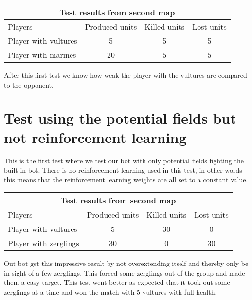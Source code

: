 \begin{centering}
\begin{table}
 \begin{tabular}{|l|c|c|c|}
	\multicolumn{4}{c}{Test results from second map} \\
	\hline
	Players & Produced units & Killed units & Lost units\\
	\hline
		Player with vultures & 5 & 5 & 5\\
	\hline
		Player with marines & 20 & 5 & 5\\
	\hline

\end{tabular}
\end{table}
\end{centering}

After this first test we know how weak the player with the vultures are compared to the opponent.
\newpage
\section{Test using the potential fields but not reinforcement learning} %
This is the first test where we test our bot with only potential fields fighting the built-in bot. There is no reinforcement learning used in this test, in other words this means that the reinforcement learning weights are all set to a constant value.\\

\begin{centering}
 \begin{tabular}{|l|c|c|c|}
	\multicolumn{4}{c}{Test results from second map} \\
	\hline
	Players & Produced units & Killed units & Lost units\\
	\hline
	\hline
		Player with vultures & 5 & 30 & 0\\
	\hline
		Player with zerglings & 30 & 0 & 30\\
	\hline

\end{tabular}
\end{centering}

Out bot get this impressive result by not overextending itself and thereby only be in sight of a few zerglings. This forced some zerglings out of the group and made them a easy target. This test went better as expected that it took out some zerglings at a time and won the match with 5 vultures with full health.\\

